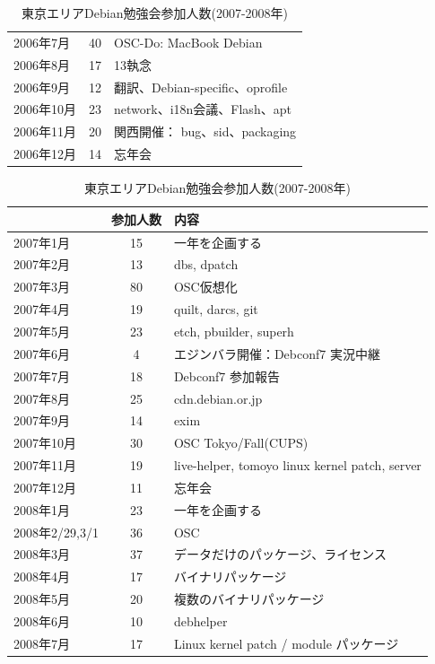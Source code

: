 \documentclass[mingoth,a4paper]{jsarticle}
\begin{document}
\begin{table}[ht]
\begin{minipage}{0.5\hsize}
\begin{center}
\begin{tabular}{|l|c|p{10em}|}
   2006年7月 & 40 & OSC-Do: MacBook Debian \\
   2006年8月 & 17 & 13執念 \\
   2006年9月 & 12 & 翻訳、Debian-specific、oprofile \\
   2006年10月 & 23 & network、i18n会議、Flash、apt \\
   2006年11月 & 20 & 関西開催： bug、sid、packaging \\
   2006年12月 & 14 & 忘年会 \\
 \hline
  \end{tabular}
 \end{center}
\end{minipage}
\begin{minipage}{0.5\hsize}
 \caption{東京エリアDebian勉強会参加人数(2007-2008年)}\label{tab:count2007}
 \begin{center}
  \begin{tabular}{|l|c|p{10em}|}
 \hline
 & 参加人数 & 内容\\
 \hline
   2007年1月 & 15 & 一年を企画する \\
   2007年2月 & 13 & dbs, dpatch\\ 
   2007年3月 & 80 & OSC仮想化 \\
   2007年4月 & 19 & quilt, darcs, git\\
   2007年5月 & 23 & etch, pbuilder, superh \\   
   2007年6月 & 4 & エジンバラ開催：Debconf7 実況中継 \\
   2007年7月 & 18 & Debconf7 参加報告\\
   2007年8月 & 25 & cdn.debian.or.jp \\   
   2007年9月 & 14 & exim \\   
   2007年10月 & 30 & OSC Tokyo/Fall(CUPS) \\   
   2007年11月 & 19 & live-helper, tomoyo linux kernel patch, server\\
   2007年12月 & 11 & 忘年会\\
   2008年1月 & 23 & 一年を企画する \\
   2008年2/29,3/1 & 36 & OSC  \\
   2008年3月 & 37 & データだけのパッケージ、ライセンス \\
   2008年4月 & 17 & バイナリパッケージ \\
   2008年5月 & 20 & 複数のバイナリパッケージ \\
   2008年6月 & 10 & debhelper \\
   2008年7月 & 17 & Linux kernel patch / module パッケージ \\

\end{tabular}
\end{center}
\end{minipage}
\end{table}
\end{document}
